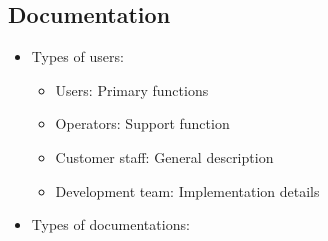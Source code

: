 \subsection{Documentation}

\begin{itemize}
\item Types of users:

\begin{itemize}
    \item Users: Primary functions
    \item Operators: Support function
    \item Customer staff: General description
    \item Development team: Implementation details
\end{itemize}

\item Types of documentations:


\end{itemize}
